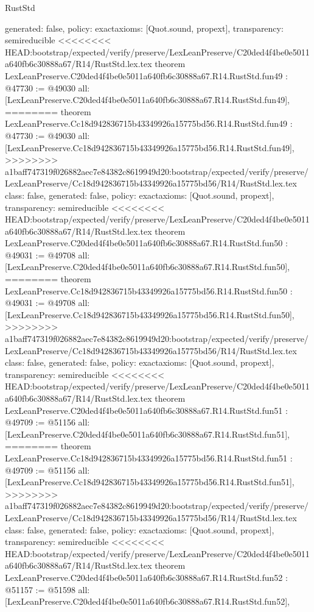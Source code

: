 \begin{lexlean}{RustStd}
\begin{coremodule}
{\begin{coremodule}
{{{{{{{{{{{{{{{{{{{{{{{{{{{{{{{{{{{{{{{{{{{{{{{{{{{{  generated: false,
  policy: exact{axioms: [Quot.sound, propext]},
  transparency: semireducible
}
<<<<<<<< HEAD:bootstrap/expected/verify/preserve/LexLeanPreserve/C20ded4f4be0e5011a640fb6c30888a67/R14/RustStd.lex.tex
theorem LexLeanPreserve.C20ded4f4be0e5011a640fb6c30888a67.R14.RustStd.fun49 : @47730 := @49030 {
  all: [LexLeanPreserve.C20ded4f4be0e5011a640fb6c30888a67.R14.RustStd.fun49],
========
theorem LexLeanPreserve.Cc18d942836715b43349926a15775bd56.R14.RustStd.fun49 : @47730 := @49030 {
  all: [LexLeanPreserve.Cc18d942836715b43349926a15775bd56.R14.RustStd.fun49],
>>>>>>>> a1baff747319f026882aec7e84382c8619949d20:bootstrap/expected/verify/preserve/LexLeanPreserve/Cc18d942836715b43349926a15775bd56/R14/RustStd.lex.tex
  class: false,
  generated: false,
  policy: exact{axioms: [Quot.sound, propext]},
  transparency: semireducible
}
<<<<<<<< HEAD:bootstrap/expected/verify/preserve/LexLeanPreserve/C20ded4f4be0e5011a640fb6c30888a67/R14/RustStd.lex.tex
theorem LexLeanPreserve.C20ded4f4be0e5011a640fb6c30888a67.R14.RustStd.fun50 : @49031 := @49708 {
  all: [LexLeanPreserve.C20ded4f4be0e5011a640fb6c30888a67.R14.RustStd.fun50],
========
theorem LexLeanPreserve.Cc18d942836715b43349926a15775bd56.R14.RustStd.fun50 : @49031 := @49708 {
  all: [LexLeanPreserve.Cc18d942836715b43349926a15775bd56.R14.RustStd.fun50],
>>>>>>>> a1baff747319f026882aec7e84382c8619949d20:bootstrap/expected/verify/preserve/LexLeanPreserve/Cc18d942836715b43349926a15775bd56/R14/RustStd.lex.tex
  class: false,
  generated: false,
  policy: exact{axioms: [Quot.sound, propext]},
  transparency: semireducible
}
<<<<<<<< HEAD:bootstrap/expected/verify/preserve/LexLeanPreserve/C20ded4f4be0e5011a640fb6c30888a67/R14/RustStd.lex.tex
theorem LexLeanPreserve.C20ded4f4be0e5011a640fb6c30888a67.R14.RustStd.fun51 : @49709 := @51156 {
  all: [LexLeanPreserve.C20ded4f4be0e5011a640fb6c30888a67.R14.RustStd.fun51],
========
theorem LexLeanPreserve.Cc18d942836715b43349926a15775bd56.R14.RustStd.fun51 : @49709 := @51156 {
  all: [LexLeanPreserve.Cc18d942836715b43349926a15775bd56.R14.RustStd.fun51],
>>>>>>>> a1baff747319f026882aec7e84382c8619949d20:bootstrap/expected/verify/preserve/LexLeanPreserve/Cc18d942836715b43349926a15775bd56/R14/RustStd.lex.tex
  class: false,
  generated: false,
  policy: exact{axioms: [Quot.sound, propext]},
  transparency: semireducible
}
<<<<<<<< HEAD:bootstrap/expected/verify/preserve/LexLeanPreserve/C20ded4f4be0e5011a640fb6c30888a67/R14/RustStd.lex.tex
theorem LexLeanPreserve.C20ded4f4be0e5011a640fb6c30888a67.R14.RustStd.fun52 : @51157 := @51598 {
  all: [LexLeanPreserve.C20ded4f4be0e5011a640fb6c30888a67.R14.RustStd.fun52],
}}}}}}}}}}}}}}}}}}}}}}}}}}}}}}}}}}}}}}}}}}}}}}}}}}}}}}}
\end{coremodule}}
\end{coremodule}
\end{lexlean}
